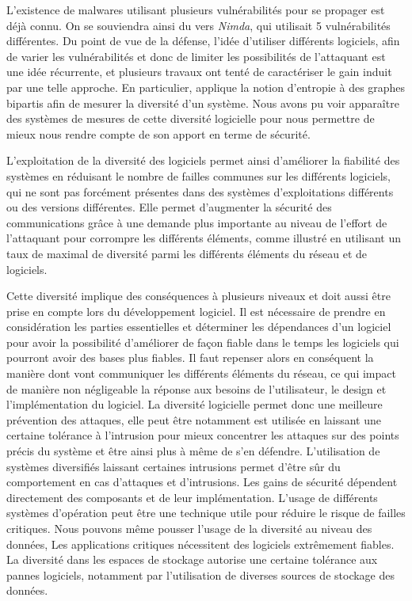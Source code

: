 L'existence de malwares utilisant plusieurs vulnérabilités pour se propager est déjà connu. On se souviendra ainsi du
vers \textit{Nimda}, qui utilisait 5 vulnérabilités différentes. Du point de vue de la défense, l'idée d'utiliser différents
logiciels, afin de varier les vulnérabilités et donc de limiter les possibilités de l'attaquant est une idée récurrente, et plusieurs
travaux ont tenté de caractériser le gain induit par une telle approche. En particulier, \cite{softwareDiversity:Security}
applique la notion d'entropie à des graphes bipartis afin de mesurer la diversité d'un système. Nous avons pu voir apparaître des systèmes de mesures de cette diversité logicielle \cite{softwareDiversityMetrics} pour nous permettre de mieux nous rendre compte de son apport en terme de sécurité.

L'exploitation de la diversité des logiciels permet ainsi d'améliorer la fiabilité des systèmes en réduisant le nombre de failles communes sur les différents logiciels, qui ne sont pas forcément présentes dans des systèmes d'exploitations différents ou des versions différentes.\cite{softwareDiversityPracticalStatistics}
Elle permet d'augmenter la sécurité des communications grâce à une demande plus importante au niveau de l'effort de l'attaquant pour corrompre les différents éléments, comme illustré en utilisant un taux de maximal de diversité parmi les différents éléments du réseau et de logiciels\cite{maximalRatio}. 

Cette diversité implique des conséquences à plusieurs niveaux et doit aussi être prise en compte lors du développement logiciel\cite{processDiversity}. Il est nécessaire de prendre en considération les parties essentielles et déterminer les dépendances d'un logiciel pour avoir la possibilité d'améliorer de façon fiable dans le temps les logiciels qui pourront avoir des bases plus fiables. Il faut repenser alors en conséquent la manière dont vont communiquer les différents éléments du réseau, ce qui impact de manière non négligeable la réponse aux besoins de l'utilisateur, le design et l'implémentation du logiciel.
La diversité logicielle permet donc une meilleure prévention des attaques, elle peut être notamment est utilisée en laissant une certaine tolérance à l'intrusion pour mieux concentrer les attaques sur des points précis du système et être ainsi plus à même de s'en défendre\cite{osDiversity}. L'utilisation de systèmes diversifiés laissant certaines intrusions permet d’être sûr du comportement en cas d’attaques et d’intrusions. Les gains de sécurité dépendent directement des composants et de leur implémentation. L'usage de différents systèmes d'opération peut être une technique utile pour réduire le risque de failles critiques. 
Nous pouvons même pousser l'usage de la diversité au niveau des données, Les applications critiques nécessitent des logiciels extrêmement fiables.  La diversité dans les espaces de stockage autorise une certaine tolérance aux pannes logiciels\cite{dataDiversity}, notamment par l'utilisation de diverses sources de stockage des données.


